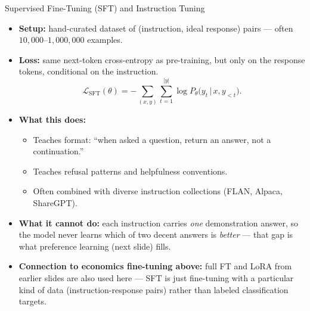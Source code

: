 \begin{frame}{Supervised Fine-Tuning (SFT) and Instruction Tuning}
\begin{itemize}
\item \textbf{Setup:} hand-curated dataset of (instruction, ideal response) pairs --- often $10{,}000$--$1{,}000{,}000$ examples.

\medskip
\item \textbf{Loss:} same next-token cross-entropy as pre-training, but only on the response tokens, conditional on the instruction.
\[
   \mathcal{L}_{\text{SFT}}(\theta)
   = -\sum_{(x,y)} \sum_{t=1}^{|y|} \log P_\theta\bigl(y_t \,\big|\, x, y_{<t}\bigr).
\]

\medskip
\item \textbf{What this does:}
\begin{itemize}
\item Teaches format: ``when asked a question, return an answer, not a continuation.''
\item Teaches refusal patterns and helpfulness conventions.
\item Often combined with diverse instruction collections (FLAN, Alpaca, ShareGPT).
\end{itemize}

\medskip
\item \textbf{What it cannot do:} each instruction carries \emph{one} demonstration answer, so the model never learns which of two decent answers is \emph{better} --- that gap is what preference learning (next slide) fills.

\medskip
\item \textbf{Connection to economics fine-tuning above:} full FT and LoRA from earlier slides are also used here --- SFT is just fine-tuning with a particular kind of data (instruction-response pairs) rather than labeled classification targets.
\end{itemize}
\end{frame}

